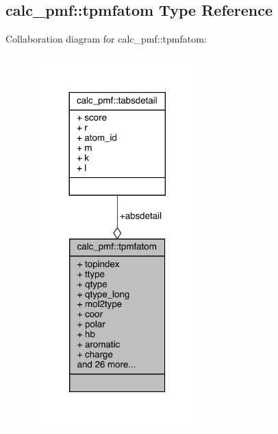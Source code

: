 \hypertarget{structcalc__pmf_1_1tpmfatom}{\subsection{calc\-\_\-pmf\-:\-:tpmfatom Type Reference}
\label{structcalc__pmf_1_1tpmfatom}
}


Collaboration diagram for calc\-\_\-pmf\-:\-:tpmfatom\-:
\nopagebreak
\begin{figure}[H]
\begin{center}
\leavevmode
\includegraphics[width=185pt]{structcalc__pmf_1_1tpmfatom__coll__graph}
\end{center}
\end{figure}
